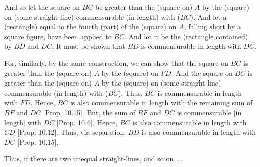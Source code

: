 \begin{Parallel}{}{}
{And so let the square on $BC$ be greater than the (square on) $A$ by the
(square) on (some straight-line) commensurable (in length) with ($BC$). And let
a (rectangle) equal to the fourth (part) of the (square) on $A$, falling
short by a square figure, have been applied to $BC$. And let it be
the (rectangle contained) by $BD$ and $DC$. It must be shown that $BD$
is commensurable in length with $DC$.

For, similarly, by the same construction, we can  show that the
square on $BC$ is greater than the (square on) $A$ by the (square) on $FD$.
And the square on $BC$ is greater than the (square on) $A$ by the
(square) on (some straight-line) commensurable (in length) with ($BC$).  Thus, $BC$ is
commensurable in length with $FD$. Hence, $BC$ is also commensurable in length with the remaining sum of $BF$ and $DC$ [Prop. 10.15]. But, the sum of $BF$ and $DC$
is commensurable [in length] with $DC$ [Prop. 10.6]. Hence, $BC$ is also
commensurable in length with $CD$ [Prop. 10.12]. 
Thus, via separation, $BD$ is also commensurable in length with $DC$ [Prop. 10.15].

Thus,  if there are two unequal straight-lines, and so on \ldots.}
\end{Parallel}



